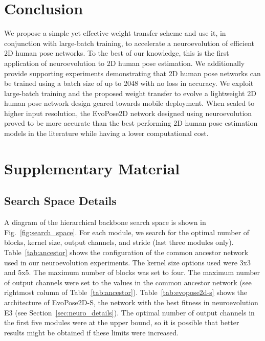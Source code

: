\documentclass{ieeeaccess}
\begin{document}
\section{Conclusion}
We propose a simple yet effective weight transfer scheme and use it, in conjunction with large-batch training, to accelerate a neuroevolution of efficient 2D human pose networks. To the best of our knowledge, this is the first application of neuroevolution to 2D human pose estimation. We additionally provide supporting experiments demonstrating that 2D human pose networks can be trained using a batch size of up to 2048 with no loss in accuracy. We exploit large-batch training and the proposed weight transfer to evolve a lightweight 2D human pose network design geared towards mobile deployment. When scaled to higher input resolution, the EvoPose2D network designed using neuroevolution proved to be more accurate than the best performing 2D human pose estimation models in the literature while having a lower computational cost. 

\appendices
\section{Supplementary Material}
\vspace{4pt}
\subsection{Search Space Details}
\label{sec:app_search_space}
A diagram of the hierarchical backbone search space is shown in Fig.\ \ref{fig:search_space}. For each module, we search for the optimal number of blocks, kernel size, output channels, and stride (last three modules only). Table~\ref{tab:ancestor} shows the configuration of the common ancestor network used in our neuroevolution experiments. The kernel size options used were 3x3 and 5x5. The maximum number of blocks was set to four. The maximum number of output channels were set to the values in the common ancestor network (see rightmost column of Table~\ref{tab:ancestor}). Table~\ref{tab:evopose2d-s} shows the architecture of EvoPose2D-S, the network with the best fitness in neuroevolution E3 (see Section~\ref{sec:neuro_details}). The optimal number of output channels in the first five modules were at the upper bound, so it is possible that better results might be obtained if these limits were increased.
\end{document}
